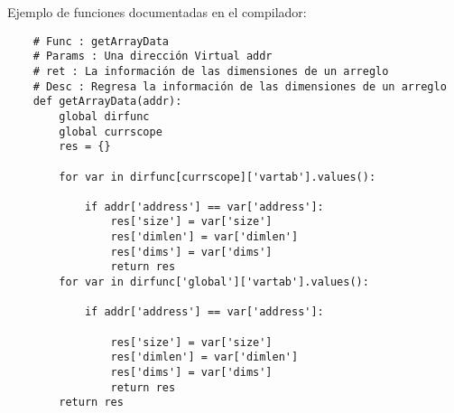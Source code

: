 \documentclass[krantz1,ChapterTOCs, spanish]{krantz}
\begin{document}
Ejemplo de funciones documentadas en el compilador:
\scriptsize
\begin{verbatim}
    # Func : getArrayData
    # Params : Una dirección Virtual addr
    # ret : La información de las dimensiones de un arreglo
    # Desc : Regresa la información de las dimensiones de un arreglo
    def getArrayData(addr):
        global dirfunc
        global currscope
        res = {}
    
        for var in dirfunc[currscope]['vartab'].values():
    
            if addr['address'] == var['address']:
                res['size'] = var['size']
                res['dimlen'] = var['dimlen']
                res['dims'] = var['dims']
                return res
        for var in dirfunc['global']['vartab'].values():
    
            if addr['address'] == var['address']:
    
                res['size'] = var['size']
                res['dimlen'] = var['dimlen']
                res['dims'] = var['dims']
                return res
        return res
    
   
\end{verbatim}
\scriptsize
\end{document}
